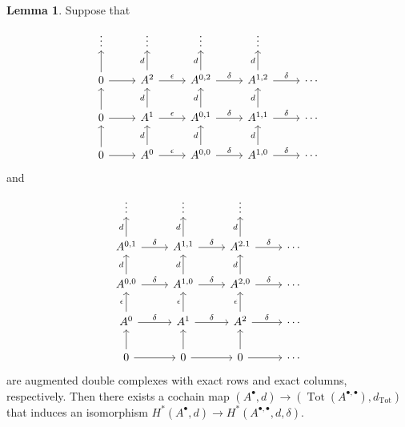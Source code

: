 \documentclass[10pt,letterpaper,cm]{nupset}
\theoremstyle{definition}
\theoremstyle{theorem}
\newtheorem{lemma}[definition]{Lemma}
\theoremstyle{remark}
\newcommand{\1}{\mathbb{1}}
\newcommand{\0}{\vec 0}
\DeclareMathOperator{\tot}{Tot}
\begin{document}
\begin{lemma}
Suppose that
\[
\begin{tikzcd}
\vdots                & \vdots                                   & \vdots                                       & \vdots                                       &        \\
0 \arrow[r] \arrow[u] & A^2 \arrow[r, "\epsilon"] \arrow[u, "d"] & {A^{0,2}} \arrow[r, "\delta"] \arrow[u, "d"] & {A^{1,2}} \arrow[r, "\delta"] \arrow[u, "d"] & \cdots \\
0 \arrow[r] \arrow[u] & A^1 \arrow[r, "\epsilon"] \arrow[u, "d"] & {A^{0,1}} \arrow[r, "\delta"] \arrow[u, "d"] & {A^{1,1}} \arrow[r, "\delta"] \arrow[u, "d"] & \cdots \\
0 \arrow[r] \arrow[u] & A^0 \arrow[r, "\epsilon"] \arrow[u, "d"] & {A^{0,0}} \arrow[r, "\delta"] \arrow[u, "d"] & {A^{1,0}} \arrow[r, "\delta"] \arrow[u, "d"] & \cdots
\end{tikzcd}
\] and 
\[
\begin{tikzcd}
\vdots                                        & \vdots                                        & \vdots                                        &        \\
{A^{0,1}} \arrow[r, "\delta"] \arrow[u, "d"]  & {A^{1,1}} \arrow[r, "\delta"] \arrow[u, "d"]  & A^{2.1} \arrow[u, "d"] \arrow[r, "\delta"]    & \cdots \\
{A^{0,0}} \arrow[r, "\delta"] \arrow[u, "d"]  & {A^{1,0}} \arrow[r, "\delta"] \arrow[u, "d"]  & {A^{2,0}} \arrow[u, "d"] \arrow[r, "\delta"]  & \cdots \\
A^0 \arrow[u, "\epsilon"] \arrow[r, "\delta"] & A^1 \arrow[u, "\epsilon"] \arrow[r, "\delta"] & A^2 \arrow[u, "\epsilon"] \arrow[r, "\delta"] & \cdots \\
0 \arrow[u] \arrow[r]                         & 0 \arrow[u] \arrow[r]                         & 0 \arrow[u] \arrow[r]               & \cdots
\end{tikzcd}
\]
are augmented double complexes with exact rows  and exact columns, respectively. Then there exists a cochain map $\left(A^{\bullet}, d\right) \to \left(\tot(A^{\bullet, \bullet}), d_{\tot}\right)$ that induces an isomorphism $H^{\ast}(A^{\bullet}, d) \to H^{\ast}(A^{\bullet, \bullet}, d, \delta).$
\end{lemma}
\end{document}
